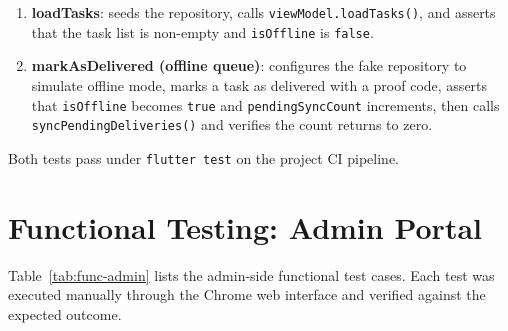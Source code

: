 \begin{enumerate}
  \item \textbf{loadTasks}: seeds the repository, calls
        \texttt{viewModel.loadTasks()}, and asserts that the task list is
        non-empty and \texttt{isOffline} is \texttt{false}.
  \item \textbf{markAsDelivered (offline queue)}: configures the fake
        repository to simulate offline mode, marks a task as delivered with a
        proof code, asserts that \texttt{isOffline} becomes \texttt{true} and
        \texttt{pendingSyncCount} increments, then calls
        \texttt{syncPendingDeliveries()} and verifies the count returns to
        zero.
\end{enumerate}

\noindent Both tests pass under \texttt{flutter test} on the project CI
pipeline.

\section{Functional Testing: Admin Portal}
\label{sec:func-admin}

Table~\ref{tab:func-admin} lists the admin-side functional test cases.  Each
test was executed manually through the Chrome web interface and verified
against the expected outcome.

